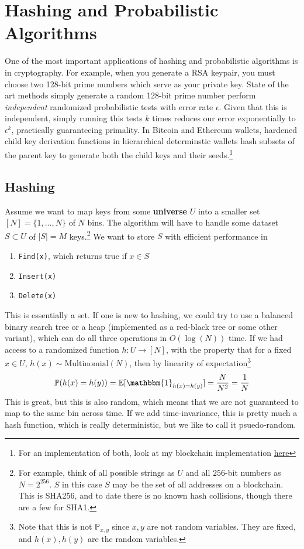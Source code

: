 \documentclass{article}
\begin{document}
\section{Hashing and Probabilistic Algorithms} 

  One of the most important applications of hashing and probabilistic algorithms is in cryptography. For example, when you generate a RSA keypair, you must choose two 128-bit prime numbers which serve as your private key. State of the art methods simply generate a random 128-bit prime number perform \textit{independent} randomized probabilistic tests with error rate $\epsilon$. Given that this is independent, simply running this tests $k$ times reduces our error exponentially to $\epsilon^k$, practically guaranteeing primality. In Bitcoin and Ethereum wallets, hardened child key derivation functions in hierarchical determinstic wallets hash subsets of the parent key to generate both the child keys and their seeds.\footnote{For an implementation of both, look at my blockchain implementation \href{https://github.com/mbahng/blade/blob/main/backend/src/crypt/primes.js\#L61}{here}} 

  \subsection{Hashing} 

    Assume we want to map keys from some \textbf{universe} $U$ into a smaller set $[N] = \{1, \ldots, N\}$ of $N$ bins. The algorithm will have to handle some dataset $S \subset U$ of $|S| = M$ keys.\footnote{For example, think of all possible strings as $U$ and all $256$-bit numbers as $N = 2^{256}$. $S$ in this case $S$ may be the set of all addresses on a blockchain. This is SHA256, and to date there is no known hash collisions, though there are a few for SHA1.} We want to store $S$ with efficient performance in 
    \begin{enumerate}
      \item \texttt{Find(x)}, which returns true if $x \in S$
      \item \texttt{Insert(x)} 
      \item \texttt{Delete(x)}
      \end{enumerate}
    This is essentially a set. If one is new to hashing, we could try to use a balanced binary search tree or a heap (implemented as a red-black tree or some other variant), which can do all three operations in $O(\log(N))$ time. If we had access to a randomized function $h: U \rightarrow [N]$, with the property that for a fixed $x \in U$, $h(x) \sim \mathrm{Multinomial}(N)$, then by linearity of expectation\footnote{Note that this is not $\mathbb{P}_{x, y}$ since $x, y$ are not random variables. They are fixed, and $h(x), h(y)$ are the random variables. }
    \begin{equation}
      \mathbb{P}(h(x) = h(y)) = \mathbb{E}[\mathbbm{1}_{h(x) = h(y)}] = \frac{N}{N^2} = \frac{1}{N}
    \end{equation}
    This is great, but this is also random, which means that we are not guaranteed to map to the same bin across time. If we add time-invariance, this is pretty much a hash function, which is really deterministic, but we like to call it psuedo-random. 
\end{document}
